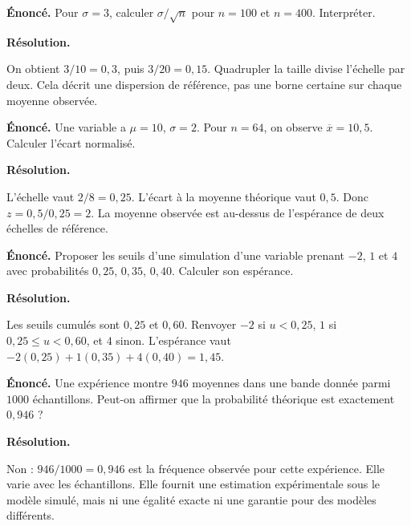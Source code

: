 \documentclass[11pt,a4paper]{article}
\begin{document}
\par\noindent\begin{minipage}{\linewidth}
{\small\color{Muted}\textbf{Énoncé.} Pour $\sigma=3$, calculer $\sigma/\sqrt n$ pour $n=100$ et $n=400$. Interpréter.}
\par\medskip
\textbf{Résolution.}\par
On obtient $3/10=0,3$, puis $3/20=0,15$. Quadrupler la taille divise l’échelle par deux. Cela décrit une dispersion de référence, pas une borne certaine sur chaque moyenne observée.
\end{minipage}\par
\par\noindent\begin{minipage}{\linewidth}
{\small\color{Muted}\textbf{Énoncé.} Une variable a $\mu=10$, $\sigma=2$. Pour $n=64$, on observe $\overline x=10,5$. Calculer l’écart normalisé.}
\par\medskip
\textbf{Résolution.}\par
L’échelle vaut $2/8=0,25$. L’écart à la moyenne théorique vaut $0,5$. Donc $z=0,5/0,25=2$. La moyenne observée est au-dessus de l’espérance de deux échelles de référence.
\end{minipage}\par
\par\noindent\begin{minipage}{\linewidth}
{\small\color{Muted}\textbf{Énoncé.} Proposer les seuils d’une simulation d’une variable prenant $-2$, $1$ et $4$ avec probabilités $0,25$, $0,35$, $0,40$. Calculer son espérance.}
\par\medskip
\textbf{Résolution.}\par
Les seuils cumulés sont $0,25$ et $0,60$. Renvoyer $-2$ si $u<0,25$, $1$ si $0,25\le u<0,60$, et $4$ sinon. L’espérance vaut $-2(0,25)+1(0,35)+4(0,40)=1,45$.
\end{minipage}\par
\par\noindent\begin{minipage}{\linewidth}
{\small\color{Muted}\textbf{Énoncé.} Une expérience montre $946$ moyennes dans une bande donnée parmi $1000$ échantillons. Peut-on affirmer que la probabilité théorique est exactement $0,946$ ?}
\par\medskip
\textbf{Résolution.}\par
Non : $946/1000=0,946$ est la fréquence observée pour cette expérience. Elle varie avec les échantillons. Elle fournit une estimation expérimentale sous le modèle simulé, mais ni une égalité exacte ni une garantie pour des modèles différents.
\end{minipage}\par
\end{document}
